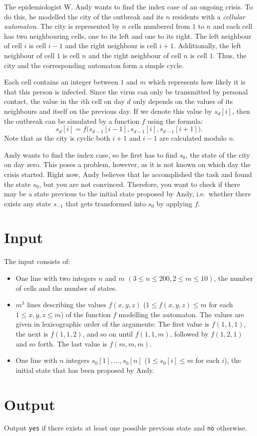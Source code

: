 
The epidemiologist W. Andy wants to find the index case of an ongoing crisis.
To do this, he modelled the city of the outbreak and its $n$ residents with a \emph{cellular automaton}.
The city is represented by $n$ cells numbered from $1$ to $n$ and each cell has two neighbouring cells, one to its left and one to its right.
The left neighbour of cell $i$ is cell $i-1$ and the right neighbour is cell $i+1$. Additionally, the left neighbour of cell $1$ is cell $n$ and the right neighbour of cell $n$ is cell $1$.
Thus, the city and the corresponding automaton form a simple cycle.

Each cell contains an integer between $1$ and $m$ which represents how likely it is that this person is infected.
Since the virus can only be transmitted by personal contact, the value in the $i$th cell on day $d$ only depends on the values of its neighbours and itself on the previous day.
If we denote this value by $s_{d}[i]$, then the outbreak can be simulated by a function $f$ using the formula:
\[s_{d}[i]=f\big(s_{d-1}[i-1],s_{d-1}[i],s_{d-1}[i+1]\big).\]
Note that as the city is cyclic both $i+1$ and $i-1$ are calculated modulo $n$.

Andy wants to find the index case, so he first has to find $s_0$, the state of the city on day zero.
This poses a problem, however, as it is not known on which day the crisis started.
Right now, Andy believes that he accomplished the task and found the state $s_0$, but you are not convinced.
Therefore, you want to check if there may be a state previous to the initial state proposed by Andy, i.e.\ whether there exists any state $s_{-1}$ that gets transformed into $s_0$ by applying $f$.

\section*{Input}
The input consists of:
\begin{itemize}
	\item One line with two integers $n$ and $m$ $(3\leq n \leq 200, 2\leq m \leq 10)$, the number of cells and the number of states.
  \item $m^3$ lines describing the values $f(x,y,z)$ ($1 \le f(x,y,z) \le m$ for each $1 \le x,y,z \le m$) of the function $f$ modelling the automaton.
    The values are given in lexicographic order of the arguments:
    The first value is $f(1,1,1)$, the next is $f(1,1,2)$, and so on until $f(1,1,m)$, followed by $f(1,2,1)$ and so forth. The last value is $f(m,m,m)$.
  \item One line with $n$ integers $s_0[1],\dots,s_0[n]$ ($1 \le s_0[i] \le m$ for each $i$), the initial state that has been proposed by Andy.
\end{itemize}

\section*{Output}
Output \texttt{yes} if there exists at least one possible previous state and \texttt{no} otherwise.
